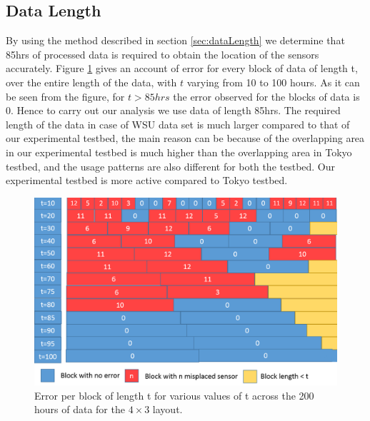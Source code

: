 \subsection{Data Length}
By using the method described in section \ref{sec:dataLength} we determine that 85hrs of processed data is required to obtain the location of the sensors accurately.  Figure \ref{fig:evst} gives an account of error for every block of data of length t, over the entire length of the data, with $t$ varying from 10 to 100 hours.
As it can be seen from the figure, for $t>85hrs$ the error observed for the blocks of data is 0. Hence to carry out our analysis we use data of length 85hrs. The required length of the data in case of WSU data set is much larger compared to that of our experimental testbed, the main reason can be because of the overlapping area in our experimental testbed is much higher than the overlapping area in Tokyo testbed, and the usage patterns are also different for both the testbed. Our experimental testbed is more active compared to Tokyo testbed.
\begin{figure}[!ht]
\includegraphics[scale=0.25]{./pics/errorvstime.png}
\caption{Error per block of length t for various values of t across the 200 hours of data for the $4 \times 3$ layout.}
\label{fig:evst}
\centering
\end{figure}

